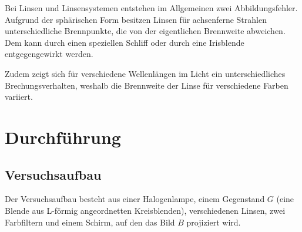 \documentclass[
  bibliography=totoc,     %
  captions=tableheading,  %
  titlepage=firstiscover, %
]{scrartcl}
\begin{document}
\noindent
Bei Linsen und Linsensystemen entstehen im Allgemeinen zwei Abbildungsfehler.
Aufgrund der sphärischen Form besitzen Linsen für achsenferne Strahlen
unterschiedliche Brennpunkte, die von der eigentlichen Brennweite abweichen.
Dem kann durch einen speziellen Schliff oder durch eine Irisblende entgegengewirkt
werden.

\noindent
Zudem zeigt sich für verschiedene Wellenlängen im Licht ein unterschiedliches
Brechungsverhalten, weshalb die Brennweite der Linse für verschiedene Farben
variiert.
\clearpage
\section{Durchführung}
\subsection{Versuchsaufbau}
Der Versuchsaufbau besteht aus einer Halogenlampe, einem Gegenstand $G$ (eine
Blende aus L-förmig angeordnetten Kreisblenden), verschiedenen Linsen, zwei
Farbfiltern und einem Schirm, auf den das Bild $B$ projiziert wird.
\end{document}

